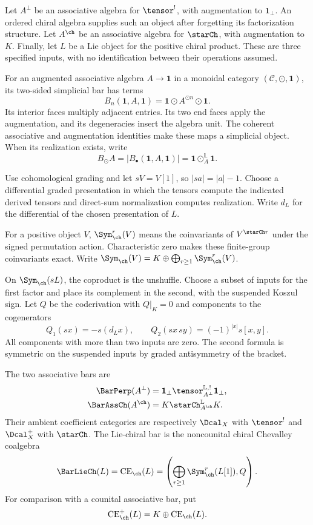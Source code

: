 Let $A^\perp$ be an associative algebra for $\tensor^!$, with augmentation to $\mathbf1_\perp$. An ordered chiral algebra supplies such an object after forgetting its factorization structure. Let $A^{\ch}$ be an associative algebra for $\starCh$, with augmentation to $K$. Finally, let $L$ be a Lie object for the positive chiral product. These are three specified inputs, with no identification between their operations assumed.

For an augmented associative algebra $A\to\mathbf1$ in a monoidal category $(\mathcal C,\odot,\mathbf1)$, its two-sided simplicial bar has terms
\[
 B_n(\mathbf1,A,\mathbf1)=\mathbf1\odot A^{\odot n}\odot\mathbf1.
\]
Its interior faces multiply adjacent entries. Its two end faces apply the augmentation, and its degeneracies insert the algebra unit. The coherent associative and augmentation identities make these maps a simplicial object. When its realization exists, write
\[
 B_\odot A=|B_\bullet(\mathbf1,A,\mathbf1)|
          =\mathbf1\odot_A^{\mathbb L}\mathbf1.
\]

Use cohomological grading and let $sV=V[1]$, so $|sa|=|a|-1$. Choose a differential graded presentation in which the tensors compute the indicated derived tensors and direct-sum normalization computes realization. Write $d_L$ for the differential of the chosen presentation of $L$.

For a positive object $V$, $\Sym_{\ch}^r(V)$ means the coinvariants of $V^{\starCh r}$ under the signed permutation action. Characteristic zero makes these finite-group coinvariants exact. Write $\Sym_{\ch}(V)=K\oplus\bigoplus_{r\geq1}\Sym_{\ch}^r(V)$.

On $\Sym_{\ch}(sL)$, the coproduct is the unshuffle. Choose a subset of inputs for the first factor and place its complement in the second, with the suspended Koszul sign. Let $Q$ be the coderivation with $Q|_K=0$ and components to the cogenerators
\begin{equation}\label{cbc:bars:chevalley-components}
 Q_1(sx)=-s(d_Lx),\qquad
 Q_2(sx\,sy)=(-1)^{|x|}s[x,y].
\end{equation}
All components with more than two inputs are zero. The second formula is symmetric on the suspended inputs by graded antisymmetry of the bracket.

\begin{definition}
\label{cbc:bars:three}
The two associative bars are
\begin{align*}
 \BarPerp(A^\perp)
 &=\mathbf1_\perp\tensor_{A^\perp}^{\mathbb L,!}\mathbf1_\perp,\\
 \BarAssCh(A^{\ch})
 &=K\starCh_{A^{\ch}}^{\mathbb L}K.
\end{align*}
Their ambient coefficient categories are respectively $\Dcal_X$ with $\tensor^!$ and $\Dcal_X^+$ with $\starCh$. The Lie-chiral bar is the noncounital chiral Chevalley coalgebra
\[
 \BarLieCh(L)=\operatorname{CE}_{\ch}(L)
 =\left(\bigoplus_{r\geq1}\Sym_{\ch}^r(L[1]),Q\right).
\]
For comparison with a counital associative bar, put
\[
 \operatorname{CE}_{\ch}^+(L)=K\oplus\operatorname{CE}_{\ch}(L).
\]
\end{definition}

